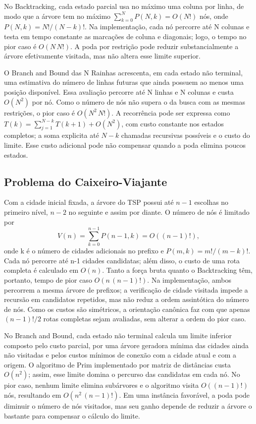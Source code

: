 \documentclass[12pt]{article}
\begin{document}
No Backtracking, cada estado parcial usa no máximo uma coluna por linha, de modo que a árvore tem no máximo $\sum_{k=0}^{N}P(N,k)=O(N!)$ nós, onde $P(N,k)=N!/(N-k)!$. Na implementação, cada nó percorre até N colunas e testa em tempo constante as marcações de coluna e diagonais; logo, o tempo no pior caso é $O(N\,N!)$. A poda por restrição pode reduzir substancialmente a árvore efetivamente visitada, mas não altera esse limite superior.

O Branch and Bound das N Rainhas acrescenta, em cada estado não terminal, uma estimativa do número de linhas futuras que ainda possuem ao menos uma posição disponível. Essa avaliação percorre até N linhas e N colunas e custa $O(N^2)$ por nó. Como o número de nós não supera o da busca com as mesmas restrições, o pior caso é $O(N^2\,N!)$. A recorrência pode ser expressa como $T(k)=\sum_{j=1}^{N-k}T(k+1)+O(N^2)$, com custo constante nos estados completos; a soma explicita até $N-k$ chamadas recursivas possíveis e o custo do limite. Esse custo adicional pode não compensar quando a poda elimina poucos estados.

\subsection{Problema do Caixeiro-Viajante}

Com a cidade inicial fixada, a árvore do TSP possui até $n-1$ escolhas no primeiro nível, $n-2$ no seguinte e assim por diante. O número de nós é limitado por
\[
V(n)=\sum_{k=0}^{n-1}P(n-1,k)=O((n-1)!),
\]
onde k é o número de cidades adicionais no prefixo e $P(m,k)=m!/(m-k)!$. Cada nó percorre até n-1 cidades candidatas; além disso, o custo de uma rota completa é calculado em $O(n)$. Tanto a força bruta quanto o Backtracking têm, portanto, tempo de pior caso $O(n\,(n-1)!)$. Na implementação, ambos percorrem a mesma árvore de prefixos; a verificação de cidade visitada impede a recursão em candidatos repetidos, mas não reduz a ordem assintótica do número de nós. Como os custos são simétricos, a orientação canônica faz com que apenas $(n-1)!/2$ rotas completas sejam avaliadas, sem alterar a ordem do pior caso.

No Branch and Bound, cada estado não terminal calcula um limite inferior composto pelo custo parcial, por uma árvore geradora mínima das cidades ainda não visitadas e pelos custos mínimos de conexão com a cidade atual e com a origem. O algoritmo de Prim implementado por matriz de distâncias custa $O(n^2)$; assim, esse limite domina o percurso das candidatas em cada nó. No pior caso, nenhum limite elimina subárvores e o algoritmo visita $O((n-1)!)$ nós, resultando em $O(n^2\,(n-1)!)$. Em uma instância favorável, a poda pode diminuir o número de nós visitados, mas seu ganho depende de reduzir a árvore o bastante para compensar o cálculo do limite.
\end{document}
